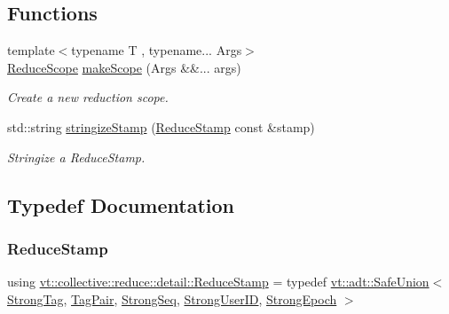 \subsection*{Functions}
\begin{DoxyCompactItemize}
\item 
{\footnotesize template$<$typename T , typename... Args$>$ }\\\hyperlink{structvt_1_1collective_1_1reduce_1_1detail_1_1_reduce_scope}{Reduce\+Scope} \hyperlink{namespacevt_1_1collective_1_1reduce_1_1detail_addecbceb802231d2689ccc0c4fc8980f}{make\+Scope} (Args \&\&... args)
\begin{DoxyCompactList}\small\item\em Create a new reduction scope. \end{DoxyCompactList}\item 
std\+::string \hyperlink{namespacevt_1_1collective_1_1reduce_1_1detail_a8c155fd8428161395debd8dc0710f583}{stringize\+Stamp} (\hyperlink{namespacevt_1_1collective_1_1reduce_1_1detail_aacc1fcd729d934ba143fee3a943bf9e7}{Reduce\+Stamp} const \&stamp)
\begin{DoxyCompactList}\small\item\em Stringize a {\ttfamily Reduce\+Stamp}. \end{DoxyCompactList}\end{DoxyCompactItemize}


\subsection{Typedef Documentation}
\mbox{\label{namespacevt_1_1collective_1_1reduce_1_1detail_aacc1fcd729d934ba143fee3a943bf9e7}} 
\subsubsection{\texorpdfstring{Reduce\+Stamp}{ReduceStamp}}
{\footnotesize\ttfamily using \hyperlink{namespacevt_1_1collective_1_1reduce_1_1detail_aacc1fcd729d934ba143fee3a943bf9e7}{vt\+::collective\+::reduce\+::detail\+::\+Reduce\+Stamp} = typedef \hyperlink{namespacevt_1_1adt_ad2a7bbcb5f4735ae9d847f96ee62f144}{vt\+::adt\+::\+Safe\+Union}$<$ \hyperlink{namespacevt_1_1collective_1_1reduce_1_1detail_a5e1b708dc12ad0d1209a354ed21ed744}{Strong\+Tag}, \hyperlink{structvt_1_1collective_1_1reduce_1_1detail_1_1_tag_pair}{Tag\+Pair}, \hyperlink{namespacevt_1_1collective_1_1reduce_1_1detail_affec2854d7d65bafb17eb259714e9443}{Strong\+Seq}, \hyperlink{namespacevt_1_1collective_1_1reduce_1_1detail_af9e42b20d1be7dccc1b5e587f0387e02}{Strong\+User\+ID}, \hyperlink{namespacevt_1_1collective_1_1reduce_1_1detail_a9e57fa5e7a2557a92ce0739edae200fe}{Strong\+Epoch} $>$}



